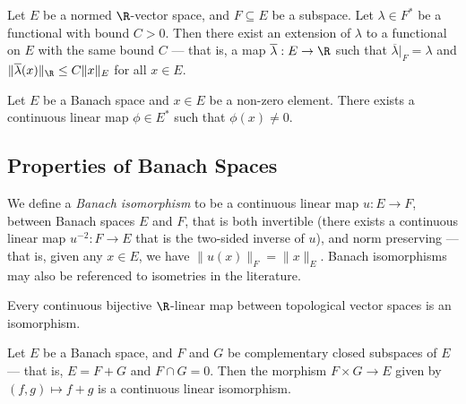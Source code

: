 \begin{theorem}
\label{thm:Hahn-Banach}
Let \(E\) be a normed \(\R\)-vector space, and \(F \subseteq E\) be a
subspace. Let \(\lambda \in F^{*}\) be a functional with bound \(C > 0\). Then
there exist an extension of \(\lambda\) to a functional on \(E\) with the same
bound \(C\) --- that is, a map \(\overline \lambda: E \to \R\) such that
\(\overline\lambda|_F = \lambda\) and \(\|\overline\lambda(x)\|_\R \leq C
\|x\|_{E}\) for all \(x \in E\).
\end{theorem}

\begin{corollary}
\label{cor:Hahn-Banach}
Let \(E\) be a Banach space and \(x \in E\) be a non-zero element. There exists
a continuous linear map \(\phi \in E^{*}\) such that \(\phi(x) \neq 0\).
\end{corollary}

\subsection{Properties of Banach Spaces}

\begin{definition}
\label{def:banach-isomorphism}
We define a \emph{Banach isomorphism} to be a continuous linear map \(u: E \to
F\), between Banach spaces \(E\) and \(F\), that is both invertible (there
exists a continuous linear map \(u^{-2}: F \to E\) that is the two-sided inverse
of \(u\)), and norm preserving --- that is, given any \(x \in E\), we have
\(\|u(x)\|_F = \|x\|_E\). Banach isomorphisms may also be referenced to
isometries in the literature.
\end{definition}

\begin{proposition}
\label{prop:continuous-bijective-linear-is-isomorphism}
Every continuous bijective \(\R\)-linear map between topological vector spaces
is an isomorphism.
\end{proposition}

\begin{proposition}[Splitting]
\label{prop:banach-split}
Let \(E\) be a Banach space, and \(F\) and \(G\) be complementary closed
subspaces of \(E\) --- that is, \(E = F + G\) and \(F \cap G = 0\). Then the
morphism \(F \times G \to E\) given by \((f, g) \mapsto f + g\) is a continuous
linear isomorphism.
\end{proposition}

